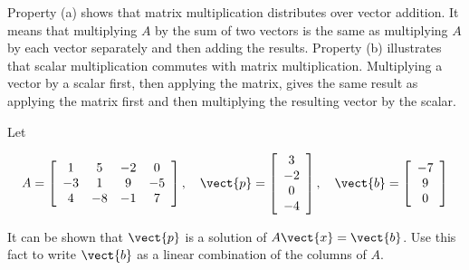 Property (a) shows that matrix multiplication distributes over vector addition. It means that multiplying \( A \) by the sum of two vectors is the same as multiplying \( A \) by each vector separately and then adding the results.     Property (b) illustrates that scalar multiplication commutes with matrix multiplication. Multiplying a vector by a scalar first, then applying the matrix, gives the same result as applying the matrix first and then multiplying the resulting vector by the scalar.

\begin{example} Let

\[
A = \left[\begin{array}{cccc}
1 & 5 & -2 & 0 \\
-3 & 1 & 9 & -5 \\
4 & -8 & -1 & 7
\end{array}\right], \quad \vect{p} = \left[\begin{array}{c}
3 \\
-2 \\
0 \\
-4
\end{array}\right], \quad \vect{b} = \left[\begin{array}{c}
-7 \\
9 \\
0
\end{array}\right]
\]

It can be shown that $\vect{p}$ is a solution of $A \vect{x} = \vect{b}$. Use this fact to write $\vect{b}$ as a linear combination of the columns of $A$.
    
\end{example}  

